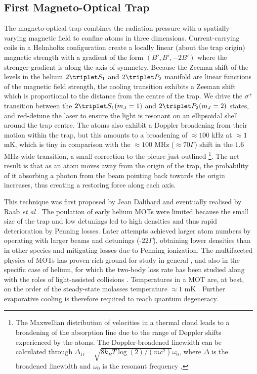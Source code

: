 
\subsection*{First Magneto-Optical Trap}
	The magneto-optical trap combines the radiation pressure with a spatially-varying magnetic field to confine atoms in three dimensions.
	Current-carrying coils in a Helmholtz configuration create a locally linear (about the trap origin) magnetic strength with a gradient of the form $(B',B',-2B')$ where the stronger gradient is along the axis of symmetry. 
	Because the Zeeman shift of the levels in the helium $2\triplet S_1$ and $2\triplet P_2$ manifold are linear functions of the magnetic field strength, the cooling transition exhibits a Zeeman shift which is proportional to the distance from the centre of the trap.
	We drive the $\sigma^+$ transition between the $2\triplet S_1(m_J=1)$ and $2\triplet P_2(m_J=2)$ states, and red-detune the laser to ensure the light is resonant on an ellipsoidal shell around the trap centre.
	The atoms also exhibit a Doppler broadening from their motion within the trap, but this amounts to a broadening of $\approx100$ kHz at $\approx1$ mK, which is tiny in comparison with the $\approx 100$ MHz ($\approx 70\Gamma$) shift in the $1.6$ MHz-wide transition, a small correction to the picure just outlined \footnote{The Maxwellian distribution of velocities in a thermal cloud leads to a broadening of the absorption line due to the range of Doppler shifts experienced by the atoms. The Doppler-broadened linewidth can be calculated through $\Delta_{D} = \sqrt{8 k_B T\log(2)/(mc^2)}\omega_0$, where $\Delta$ is the broadened linewidth and $\omega_0$ is the resonant frequency \cite{FootAtomic}.}.
	The net result is that as an atom moves away from the origin of the trap, the probability of it absorbing a photon from the beam pointing back towards the origin increases, thus creating a restoring force along each axis.

	This technique was first proposed by Jean Dalibard and eventually realised by Raab \emph{et al} \cite{Raab87}.
	The poulation of early helium MOTs were limited because the small size of the trap and low detunings led to high densities and thus rapid deterioration by Penning losses.
	Later attempts achieved larger atom numbers by operating with larger beams and detunings (-22$\Gamma$), obtaining lower densities than in other species \cite{Tol99} and mitigating losses due to Penning ionization.
	The multifaceted physics of MOTs has proven rich ground for study in general \cite{Townsend95,Walker90}, and also in the specific case of helium, for which the two-body loss rate has been studied \cite{Tol99} along with the roles of light-assisted collisions \cite{Papers}. 
	Temperatures in a MOT are, at best, on the order of the steady-state molasses temperature $\approx1$ mK \cite{Lett81}.
	Further evaporative cooling is therefore required to reach quantum degeneracy.
	
